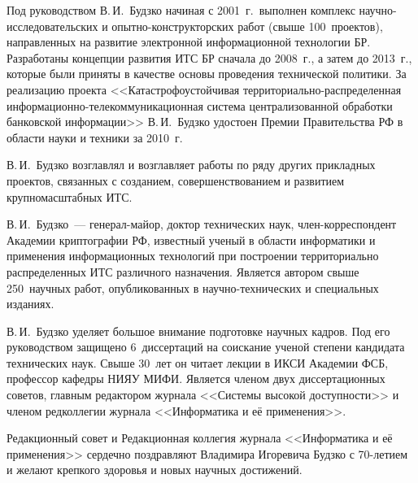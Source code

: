 \begin{multicols}{2}
      Под руководством В.\,И.~Будзко начиная с 2001~г.\ выполнен комплекс
      на\-уч\-но-ис\-сле\-до\-ва\-тель\-ских и
      опыт\-но-кон\-ст\-рук\-тор\-ских работ (свыше 100~проектов),
направленных на развитие электронной информационной технологии БР.
Разработаны концепции развития ИТС БР сначала до 2008~г., а затем до 2013~г., которые
были приняты в качестве основы проведения технической политики. За реализацию проекта
<<Катастрофоустойчивая тер\-ри\-то\-ри\-аль\-но-рас\-пре\-де\-лен\-ная
      ин\-фор\-ма\-ци\-он\-но-те\-ле\-ком\-му\-ни\-ка\-ци\-он\-ная сис\-те\-ма централизованной
обработки банковской информации>> В.\,И.~Будзко удостоен Премии Правительства РФ в
области науки и техники за 2010~г.

      В.\,И.~Будзко возглавлял и возглавляет работы по ряду других прикладных проектов,
связанных с созданием, совершенствованием и развитием крупномасштабных ИТС.

      В.\,И.~Будзко~--- генерал-майор, доктор технических наук, член-кор\-рес\-пон\-дент
Академии криптографии РФ, известный ученый в области информатики и применения
информационных технологий при построении территориально распределенных ИТС
различного назначения. Является автором свыше 250~научных работ, опубликованных в
на\-уч\-но-тех\-ни\-че\-ских и специальных изданиях.

    \thispagestyle{empty}

      В.\,И.~Будзко уделяет большое внимание подготовке научных кадров. Под его
руководством защищено 6~диссертаций на соискание ученой степени кандидата
технических наук. Свыше 30~лет он читает лекции в ИКСИ Академии ФСБ, профессор
кафедры НИЯУ МИФИ. Является членом двух диссертационных советов, главным
редактором журнала <<Системы высокой доступности>> и членом редколлегии журнала
<<Информатика и её применения>>.

      \bigskip

      Редакционный совет и Редакционная коллегия журнала <<Информатика и её
применения>> сердечно поздравляют Владимира Игоревича Будзко с 70-ле\-ти\-ем и желают
крепкого здоровья и новых научных достижений.

\end{multicols}